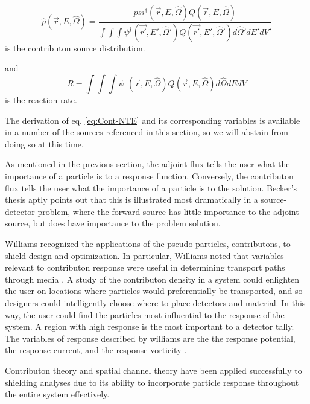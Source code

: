 \begin{equation}
\hat p(\vec{r}, E, \hat\Omega) =
\frac{psi^{\dagger}(\vec{r}, E, \hat\Omega) Q(\vec{r},E,\hat\Omega)}
{\int \int \int \psi^{\dagger}(\vec{r'},E',\hat\Omega')Q(\vec{r'},E',\hat\Omega') d\hat\Omega' dE' dV'}
\end{equation}
is the contributon source distribution.

and
\begin{equation}
R = \int \int \int \psi^{\dagger}(\vec{r},E,\hat\Omega)Q(\vec{r},E,\hat\Omega) d\hat\Omega dE dV
\end{equation}
is the reaction rate.


The derivation of eq. \ref{eq:Cont-NTE} and its corresponding variables is available in a number of the sources referenced in this section, so we will abstain from doing so at this time. 

As mentioned in the previous section, the adjoint flux tells the user what the importance of a particle is to a response function. Conversely, the contributon flux tells the user what the importance of a particle is to the solution. Becker's thesis \cite{becker_hybrid_2009} aptly points out that this is illustrated most dramatically in a source-detector problem, where the forward source has little importance to the adjoint source, but does have importance to the problem solution. 

Williams recognized the applications of the pseudo-particles, contributons, to shield design and optimization. In particular, Williams noted that variables relevant to contributon response were useful in determining transport paths through media \cite{williams_contributon_study, williams_SCC_shielding}. A study of the contributon density in a system could enlighten the user on locations where particles would preferentially be transported, and so designers could intelligently choose where to place detectors and material. In this way, the user could find the particles most influential to the response of the system. A region with high response is the most important to a detector tally. The variables of response described by williams are the the response potential, the response current, and the response vorticity \cite{williams_contributorn_1992}. 

Contributon theory and spatial channel theory have been applied successfully to shielding analyses \cite{seydaliev_contributon_2008, williams_SCC_shielding} due to its ability to incorporate particle response throughout the entire system effectively. 


